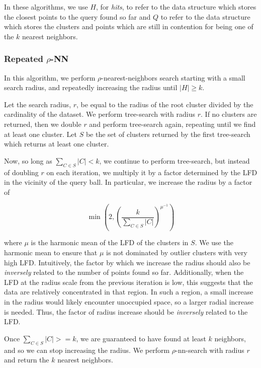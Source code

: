 In these algorithms, we use $H$, for \emph{hits}, to refer to the data structure which stores the closest points to the query found so far and $Q$ to refer to the data structure which stores the clusters and points which are still in contention for being one of the $k$ nearest neighbors.


\subsubsection{Repeated \texorpdfstring{$\rho$}{p}-NN}
\label{subsubsec:methods:knn-search:repeated-rnn}

In this algorithm, we perform $\rho$-nearest-neighbors search starting with a small search radius, and repeatedly increasing the radius until $|H| \geq k$.

Let the search radius, $r$, be equal to the radius of the root cluster divided by the cardinality of the dataset.
We perform tree-search with radius $r$.
If no clusters are returned, then we double $r$ and perform tree-search again, repeating until we find at least one cluster.
Let $S$ be the set of clusters returned by the first tree-search which returns at least one cluster.

Now, so long as $\sum_{C \in S} |C| < k$, we continue to perform tree-search, but instead of doubling $r$ on each iteration, we multiply it by a factor determined by the LFD in the vicinity of the query ball. 
In particular, we increase the radius by a factor of

\begin{equation}
    \min \left(2, \left( {\frac{k}{\sum_{C \in S} |C|}} \right)^{\mu^{-1}} \right)
    \label{eq:repeated-rnn-factor}
\end{equation}

where $\mu$ is the harmonic mean of the LFD of the clusters in $S$.
We use the harmonic mean to ensure that $\mu$ is not dominated by outlier clusters with very high LFD. 
Intuitively, the factor by which we increase the radius should also be \emph{inversely} related to the number of points found so far. 
Additionally, when the LFD at the radius scale from the previous iteration is low, this suggests that the data are relatively concentrated in that region.
In such a region, a small increase in the radius would likely encounter unoccupied space, so a larger radial increase is needed.
Thus, the factor of radius increase should be \emph{inversely} related to the LFD.

Once $\sum_{C \in S} |C| >= k$, we are guaranteed to have found at least $k$ neighbors, and so we can stop increasing the radius.
We perform $\rho$-nn-search with radius $r$ and return the $k$ nearest neighbors.


